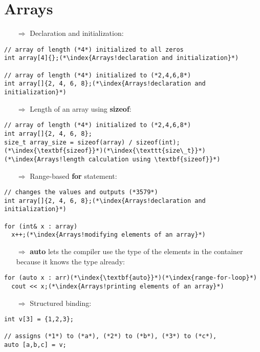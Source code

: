 \documentclass[10pt]{book}
\begin{document}
\section{Arrays}
\begin{enumerate}
\item[$\Rightarrow$] Declaration and initialization:
\end{enumerate}
\begin{lstlisting}
// array of length (*4*) initialized to all zeros
int array[4]{};(*\index{Arrays!declaration and initialization}*)

// array of length (*4*) initialized to (*2,4,6,8*)
int array[]{2, 4, 6, 8};(*\index{Arrays!declaration and initialization}*)
\end{lstlisting}
\begin{enumerate}
\item[$\Rightarrow$] Length of an array using \textbf{sizeof}:
\end{enumerate}
\begin{lstlisting}
// array of length (*4*) initialized to (*2,4,6,8*)
int array[]{2, 4, 6, 8};
size_t array_size = sizeof(array) / sizeof(int);(*\index{\textbf{sizeof}}*)(*\index{\texttt{size\_t}}*)(*\index{Arrays!length calculation using \textbf{sizeof}}*)
\end{lstlisting}
\begin{enumerate}
\item[$\Rightarrow$] Range-based \textbf{for} statement:
\end{enumerate}
\begin{lstlisting}
// changes the values and outputs (*3579*)
int array[]{2, 4, 6, 8};(*\index{Arrays!declaration and initialization}*)

for (int& x : array)
  x++;(*\index{Arrays!modifying elements of an array}*)
\end{lstlisting}
\begin{enumerate}
\item[$\Rightarrow$] \textbf{auto} lets the compiler use the type of the elements in the container because it knows the type already:
\end{enumerate}
\begin{lstlisting}
for (auto x : arr)(*\index{\textbf{auto}}*)(*\index{range-for-loop}*)
  cout << x;(*\index{Arrays!printing elements of an array}*)
\end{lstlisting}
\begin{enumerate}
\item[$\Rightarrow$] Structured binding:
\end{enumerate}
\begin{lstlisting}
int v[3] = {1,2,3};

// assigns (*1*) to (*a*), (*2*) to (*b*), (*3*) to (*c*), 
auto [a,b,c] = v;
\end{lstlisting}
%
%
\end{document}
